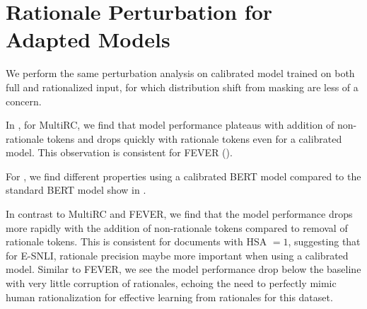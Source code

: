 \section{Rationale Perturbation for Adapted Models}

We perform the same perturbation analysis on calibrated model trained on both full and rationalized input, for which distribution shift from masking are less of a concern. 

In , for MultiRC, we find that model performance plateaus with addition of non-rationale tokens and drops quickly with rationale tokens even for a calibrated model. This observation is consistent for FEVER (). 

For \esnli, we find different properties using a calibrated BERT model compared to the standard BERT model show in . 

In contrast to MultiRC and FEVER, we find that the model performance drops more rapidly with the addition of non-rationale tokens compared to removal of rationale tokens. This is consistent for documents with HSA $=1$, suggesting that for E-SNLI, rationale precision maybe more important when using a calibrated model. Similar to FEVER, we see the model performance drop below the baseline with very little corruption of rationales, echoing the need to perfectly mimic human rationalization for effective learning from rationales for this dataset.


\label{subsubsec:calibrated-model}



